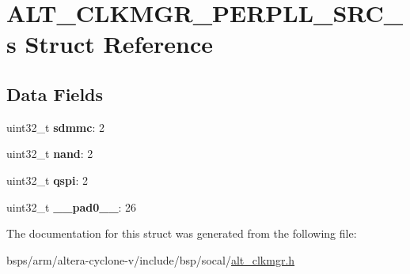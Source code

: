 \hypertarget{structALT__CLKMGR__PERPLL__SRC__s}{}\section{A\+L\+T\+\_\+\+C\+L\+K\+M\+G\+R\+\_\+\+P\+E\+R\+P\+L\+L\+\_\+\+S\+R\+C\+\_\+s Struct Reference}
\label{structALT__CLKMGR__PERPLL__SRC__s}
\subsection*{Data Fields}
\begin{DoxyCompactItemize}
\item 
\mbox{\label{structALT__CLKMGR__PERPLL__SRC__s_a90b1a084ffcdbf989f3c7b1d23c83086}} 
uint32\+\_\+t {\bfseries sdmmc}\+: 2
\item 
\mbox{\label{structALT__CLKMGR__PERPLL__SRC__s_a89046b424acdb7cded45968cd90b085a}} 
uint32\+\_\+t {\bfseries nand}\+: 2
\item 
\mbox{\label{structALT__CLKMGR__PERPLL__SRC__s_a331d798c994fbe5b5a475236229881b0}} 
uint32\+\_\+t {\bfseries qspi}\+: 2
\item 
\mbox{\label{structALT__CLKMGR__PERPLL__SRC__s_afa6b36af1192633d01610de11a971ea9}} 
uint32\+\_\+t {\bfseries \+\_\+\+\_\+pad0\+\_\+\+\_\+}\+: 26
\end{DoxyCompactItemize}


The documentation for this struct was generated from the following file\+:\begin{DoxyCompactItemize}
\item 
bsps/arm/altera-\/cyclone-\/v/include/bsp/socal/\mbox{\hyperlink{alt__clkmgr_8h}{alt\+\_\+clkmgr.\+h}}\end{DoxyCompactItemize}
